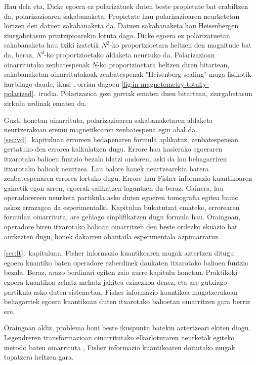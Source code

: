 Hau dela eta, Dicke egoera ez polarizatuek duten beste propietate bat erabiltzen da, polarizazioaren sakabanaketa.
Propietate hau polarizazioaren neurketetan lortzen den datuen sakabanaketa da.
Datuen sakabanaketa hau Heisenbergen ziurgabetasun printzipioarekin lotuta dago.
Dicke egoera ez polarizatuetan sakabanaketa hau txiki izatetik $N^2$-ko proportzioetara heltzen den magnitude bat da, beraz, $N^2$-ko proportzioetako aldaketa neurtuko da.
Polarizazioan oinarritutako zenbatespenak $N$-ko proportzioetara heltzen diren bitartean, sakabanaketan oinarritutakoak zenbatespenak "Heisenberg scaling" muga fisikotik hurbilago daude, ikusi \pageref{fig:in-magnetometry-totally-polarized}. orrian dagoen \ref{fig:in-magnetometry-totally-polarized}.~irudia.
Polarizazioa gezi gorriak ematen duen bitartean, ziurgabetasun zirkulu urdinak ematen du.

Guzti honetan oinarrituta, polarizazioaren sakabanaketaren aldaketa neurtzerakoan eremu magnetikoaren zenbatespena egin ahal da.
\ref{sec:vd}.~kapituluan erroreen hedapenaren formula aplikatuz, zenbatespenean gertatuko den errorea kalkulatzen dugu.
Errore hau hasierako egoeraren itxarotako balioen funtzio bezala idatzi ondoren, aski da lau behagarriren itxarotako balioak neurtzea.
Lau balore hauek neurtzearekin batera zenbatespenaren errorea lortuko dugu.
Errore hau Fisher informazio kuantikoaren gainetik egon arren, egoerak sailkatzen laguntzen du beraz.
Gainera, lau operadorereen neurketa partikula asko duten egoeren tomografia egitea baino askoz errazagoa da esperimentalki.
Kapitulua bukatutzat emateko, errorearen formulan oinarrituta, are gehiago sinplifikatzen dugu formula hau.
Oraingoan, operadore biren itxarotako balioan oinarritzen den beste ordezko ekuazio bat aurkezten dugu, honek dakarren abantaila esperimentala azpimarratuz.

\ref{sec:lt}.~kapituluan, Fisher informazio kuantikoaren mugak aztertzen ditugu egoera kuantiko baten operadore ezberdinek daukaten itxarotako balioen funtzio bezala.
Beraz, arazo berdinari egiten zaio aurre kapitulu honetan.
Praktikoki egoera kuantikoa zehatz-mehatz jakitea ezinezkoa denez, eta are gutxiago partikula asko duten sistemetan, Fisher informazio kuantikoa mugatzerakoan behagarriek egoera kuantikoan duten itxarotako balioetan oinarritzen gara berriz ere.

Oraingoan aldiz, problema honi beste ikuspuntu batekin aztertzeari ekiten diogu.
Legendreren transformazioan oinarritutako elkarloturaren neurketak egiteko metodo baten oinarrituta \cite{Guehne2007}, Fisher informazio kuantikoaren doitutako mugak topatzera heltzen gara.

